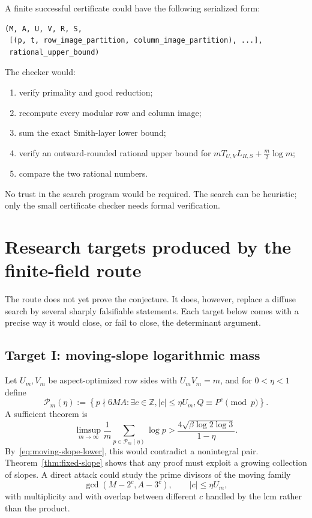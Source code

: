 \documentclass[11pt]{article}
\theoremstyle{definition}
\theoremstyle{remark}
\newcommand{\Z}{\mathbb Z}
\begin{document}
A finite successful certificate could have the following serialized form:
\begin{verbatim}
(M, A, U, V, R, S,
 [(p, t, row_image_partition, column_image_partition), ...],
 rational_upper_bound)
\end{verbatim}
The checker would:
\begin{enumerate}[label=\textup{(C\arabic*)}]
\item verify primality and good reduction;
\item recompute every modular row and column image;
\item sum the exact Smith-layer lower bound;
\item verify an outward-rounded rational upper bound for
$mT_{U,V}L_{R,S}+\tfrac m2\log m$;
\item compare the two rational numbers.
\end{enumerate}
No trust in the search program would be required.  The search can be heuristic; only the small certificate checker needs formal verification.

\section{Research targets produced by the finite-field route}
\label{sec:targets}

The route does not yet prove the conjecture.  It does, however, replace a diffuse search by several sharply falsifiable statements.  Each target below comes with a precise way it would close, or fail to close, the determinant argument.

\subsection{Target I: moving-slope logarithmic mass}

Let $U_m,V_m$ be aspect-optimized row sides with $U_mV_m=m$, and for $0<\eta<1$ define
\[
 \mathcal P_m(\eta)
 :=\left\{p\nmid6MA:\exists c\in\Z,
 |c|\le\eta U_m,
 Q\equiv P^c\pmod p\right\}.
\]
A sufficient theorem is
\begin{equation}
 \limsup_{m\to\infty}
 \frac1m\sum_{p\in\mathcal P_m(\eta)}\log p
 >\frac{4\sqrt{\beta\log2\log3}}{1-\eta}.
 \label{eq:target-I}
\end{equation}
By~\eqref{eq:moving-slope-lower}, this would contradict a nonintegral pair.  Theorem~\ref{thm:fixed-slope} shows that any proof must exploit a growing collection of slopes.  A direct attack could study the prime divisors of the moving family
\[
 \gcd(M-2^c,A-3^c),\qquad |c|\le\eta U_m,
\]
with multiplicity and with overlap between different $c$ handled by the lcm rather than the product.
\end{document}
